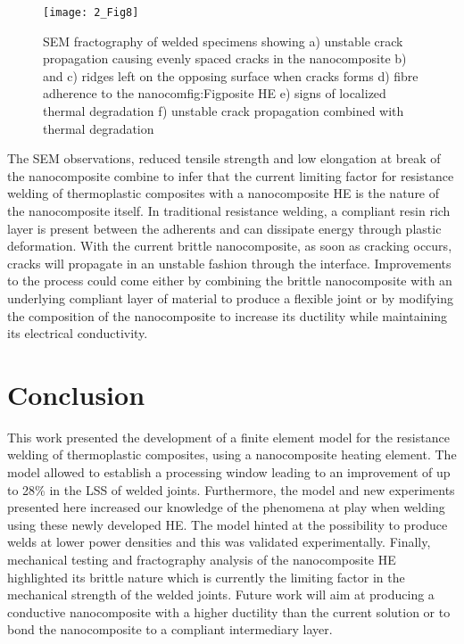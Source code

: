 \begin{figure}[htb]
	\center
	\texttt{[image: 2\_Fig8]}
	\caption{SEM fractography of welded specimens showing a) unstable crack propagation causing evenly spaced cracks in the nanocomposite b) and c) ridges left on the opposing surface when cracks forms d) fibre adherence to the nanocomfig:Figposite HE e) signs of localized thermal degradation f) unstable crack propagation combined with thermal degradation \cite{Brassard2019b}}
	\label{fig:2_Fig8}
\end{figure} 

The SEM observations, reduced tensile strength and low elongation at break of the nanocomposite combine to infer that the current limiting factor for resistance welding of thermoplastic composites with a nanocomposite HE is the nature of the nanocomposite itself. 
In traditional resistance welding, a compliant resin rich layer is present between the adherents and can dissipate energy through plastic deformation. 
With the current brittle nanocomposite, as soon as cracking occurs, cracks will propagate in an unstable fashion through the interface. 
Improvements to the process could come either by combining the brittle nanocomposite with an underlying compliant layer of material to produce a flexible joint or by modifying the composition of the nanocomposite to increase its ductility while maintaining its electrical conductivity. 

\FloatBarrier
\section{Conclusion}

This work presented the development of a finite element model for the resistance welding of thermoplastic composites, using a nanocomposite heating element. 
The model allowed to establish a processing window leading to an improvement of up to 28\% in the LSS of welded joints. 
Furthermore, the model and new experiments presented here increased our knowledge of the phenomena at play when welding using these newly developed HE. 
The model hinted at the possibility to produce welds at lower power densities and this was validated experimentally. 
Finally, mechanical testing and fractography analysis of the nanocomposite HE highlighted its brittle nature which is currently the limiting factor in the mechanical strength of the welded joints. 
Future work will aim at producing a conductive nanocomposite with a higher ductility than the current solution or to bond the nanocomposite to a compliant intermediary layer. 

